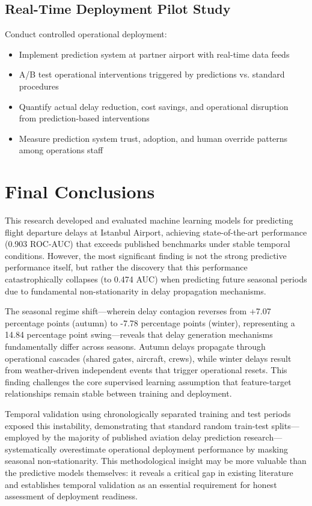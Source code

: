 \documentclass{report}
\begin{document}
\subsection{Real-Time Deployment Pilot Study}

Conduct controlled operational deployment:
\begin{itemize}
    \item Implement prediction system at partner airport with real-time data feeds
    \item A/B test operational interventions triggered by predictions vs. standard procedures
    \item Quantify actual delay reduction, cost savings, and operational disruption from prediction-based interventions
    \item Measure prediction system trust, adoption, and human override patterns among operations staff
\end{itemize}

\section{Final Conclusions}
\label{sec:final_conclusions}

This research developed and evaluated machine learning models for predicting flight departure delays at Istanbul Airport, achieving state-of-the-art performance (0.903 ROC-AUC) that exceeds published benchmarks under stable temporal conditions. However, the most significant finding is not the strong predictive performance itself, but rather the discovery that this performance catastrophically collapses (to 0.474 AUC) when predicting future seasonal periods due to fundamental non-stationarity in delay propagation mechanisms.

The seasonal regime shift—wherein delay contagion reverses from +7.07 percentage points (autumn) to -7.78 percentage points (winter), representing a 14.84 percentage point swing—reveals that delay generation mechanisms fundamentally differ across seasons. Autumn delays propagate through operational cascades (shared gates, aircraft, crews), while winter delays result from weather-driven independent events that trigger operational resets. This finding challenges the core supervised learning assumption that feature-target relationships remain stable between training and deployment.

Temporal validation using chronologically separated training and test periods exposed this instability, demonstrating that standard random train-test splits—employed by the majority of published aviation delay prediction research—systematically overestimate operational deployment performance by masking seasonal non-stationarity. This methodological insight may be more valuable than the predictive models themselves: it reveals a critical gap in existing literature and establishes temporal validation as an essential requirement for honest assessment of deployment readiness.
\end{document}
